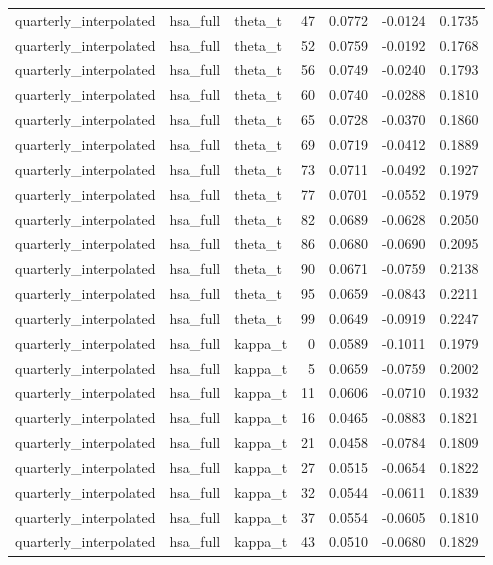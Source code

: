 \begin{tabular}{lllrrrr}
quarterly\_interpolated & hsa\_full & theta\_t & 47 & 0.0772 & -0.0124 & 0.1735 \\
quarterly\_interpolated & hsa\_full & theta\_t & 52 & 0.0759 & -0.0192 & 0.1768 \\
quarterly\_interpolated & hsa\_full & theta\_t & 56 & 0.0749 & -0.0240 & 0.1793 \\
quarterly\_interpolated & hsa\_full & theta\_t & 60 & 0.0740 & -0.0288 & 0.1810 \\
quarterly\_interpolated & hsa\_full & theta\_t & 65 & 0.0728 & -0.0370 & 0.1860 \\
quarterly\_interpolated & hsa\_full & theta\_t & 69 & 0.0719 & -0.0412 & 0.1889 \\
quarterly\_interpolated & hsa\_full & theta\_t & 73 & 0.0711 & -0.0492 & 0.1927 \\
quarterly\_interpolated & hsa\_full & theta\_t & 77 & 0.0701 & -0.0552 & 0.1979 \\
quarterly\_interpolated & hsa\_full & theta\_t & 82 & 0.0689 & -0.0628 & 0.2050 \\
quarterly\_interpolated & hsa\_full & theta\_t & 86 & 0.0680 & -0.0690 & 0.2095 \\
quarterly\_interpolated & hsa\_full & theta\_t & 90 & 0.0671 & -0.0759 & 0.2138 \\
quarterly\_interpolated & hsa\_full & theta\_t & 95 & 0.0659 & -0.0843 & 0.2211 \\
quarterly\_interpolated & hsa\_full & theta\_t & 99 & 0.0649 & -0.0919 & 0.2247 \\
quarterly\_interpolated & hsa\_full & kappa\_t & 0 & 0.0589 & -0.1011 & 0.1979 \\
quarterly\_interpolated & hsa\_full & kappa\_t & 5 & 0.0659 & -0.0759 & 0.2002 \\
quarterly\_interpolated & hsa\_full & kappa\_t & 11 & 0.0606 & -0.0710 & 0.1932 \\
quarterly\_interpolated & hsa\_full & kappa\_t & 16 & 0.0465 & -0.0883 & 0.1821 \\
quarterly\_interpolated & hsa\_full & kappa\_t & 21 & 0.0458 & -0.0784 & 0.1809 \\
quarterly\_interpolated & hsa\_full & kappa\_t & 27 & 0.0515 & -0.0654 & 0.1822 \\
quarterly\_interpolated & hsa\_full & kappa\_t & 32 & 0.0544 & -0.0611 & 0.1839 \\
quarterly\_interpolated & hsa\_full & kappa\_t & 37 & 0.0554 & -0.0605 & 0.1810 \\
quarterly\_interpolated & hsa\_full & kappa\_t & 43 & 0.0510 & -0.0680 & 0.1829 \\

\end{tabular}
